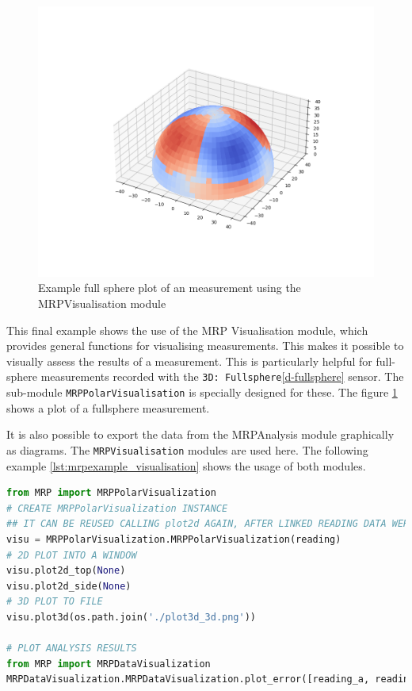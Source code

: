 \begin{figure}
\centering
\includegraphics{./generated_images/border_Example_full_sphere_plot_of_an_measurement_using_the_MRPVisualisation_module.png}
\caption{Example full sphere plot of an measurement using the
MRPVisualisation module
\label{Example_full_sphere_plot_of_an_measurement_using_the_MRPVisualisation_module.png}}
\end{figure}

This final example shows the use of the MRP Visualisation module, which
provides general functions for visualising measurements. This makes it
possible to visually assess the results of a measurement. This is
particularly helpful for full-sphere measurements recorded with the
\passthrough{\lstinline!3D: Fullsphere!}\ref{d-fullsphere} sensor. The
sub-module \passthrough{\lstinline!MRPPolarVisualisation!} is specially
designed for these. The figure
\ref{Example_full_sphere_plot_of_an_measurement_using_the_MRPVisualisation_module.png}
shows a plot of a fullsphere measurement.

It is also possible to export the data from the MRPAnalysis module
graphically as diagrams. The \passthrough{\lstinline!MRPVisualisation!}
modules are used here. The following example
\ref{lst:mrpexample_visualisation} shows the usage of both modules.

\begin{lstlisting}[language=Python, caption={MRPVisualisation example which plots a fullsphere to an image file}, label=lst:mrpexample_visualisation]
from MRP import MRPPolarVisualization
# CREATE MRPPolarVisualization INSTANCE
## IT CAN BE REUSED CALLING plot2d AGAIN, AFTER LINKED READING DATA WERE MODIFIED
visu = MRPPolarVisualization.MRPPolarVisualization(reading)
# 2D PLOT INTO A WINDOW
visu.plot2d_top(None)
visu.plot2d_side(None)
# 3D PLOT TO FILE
visu.plot3d(os.path.join('./plot3d_3d.png'))

# PLOT ANALYSIS RESULTS
from MRP import MRPDataVisualization
MRPDataVisualization.MRPDataVisualization.plot_error([reading_a, reading_b, reading_c])
\end{lstlisting}

